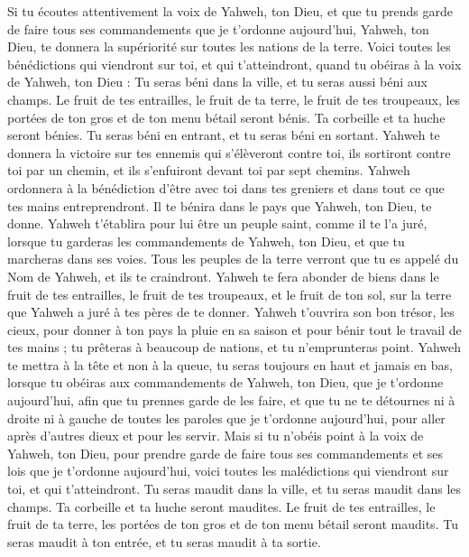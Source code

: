 \begin{multicols}{2}
\VerseOne{}Si tu écoutes attentivement la voix de Yahweh, ton Dieu, et que tu prends garde de faire tous ses commandements que je t’ordonne aujourd'hui, Yahweh, ton Dieu, te donnera la supériorité sur toutes les nations de la terre.
Voici toutes les bénédictions qui viendront sur toi, et qui t'atteindront, quand tu obéiras à la voix de Yahweh, ton Dieu :
Tu seras béni dans la ville, et tu seras aussi béni aux champs.
Le fruit de tes entrailles, le fruit de ta terre, le fruit de tes troupeaux, les portées de ton gros et de ton menu bétail seront bénis.
Ta corbeille et ta huche seront bénies.
Tu seras béni en entrant, et tu seras béni en sortant.
Yahweh te donnera la victoire sur tes ennemis qui s'élèveront contre toi, ils sortiront contre toi par un chemin, et ils s'enfuiront devant toi par sept chemins.
Yahweh ordonnera à la bénédiction d’être avec toi dans tes greniers et dans tout ce que tes mains entreprendront. Il te bénira dans le pays que Yahweh, ton Dieu, te donne.
Yahweh t'établira pour lui être un peuple saint, comme il te l'a juré, lorsque tu garderas les commandements de Yahweh, ton Dieu, et que tu marcheras dans ses voies.
Tous les peuples de la terre verront que tu es appelé du Nom de Yahweh, et ils te craindront.
Yahweh te fera abonder de biens dans le fruit de tes entrailles, le fruit de tes troupeaux, et le fruit de ton sol, sur la terre que Yahweh a juré à tes pères de te donner.
Yahweh t'ouvrira son bon trésor, les cieux, pour donner à ton pays la pluie en sa saison et pour bénir tout le travail de tes mains ; tu prêteras à beaucoup de nations, et tu n'emprunteras point.
Yahweh te mettra à la tête et non à la queue, tu seras toujours en haut et jamais en bas, lorsque tu obéiras aux commandements de Yahweh, ton Dieu, que je t’ordonne aujourd'hui, afin que tu prennes garde de les faire,
et que tu ne te détournes ni à droite ni à gauche de toutes les paroles que je t’ordonne aujourd'hui, pour aller après d'autres dieux et pour les servir.
Mais si tu n'obéis point à la voix de Yahweh, ton Dieu, pour prendre garde de faire tous ses commandements et ses lois que je t’ordonne aujourd'hui, voici toutes les malédictions qui viendront sur toi, et qui t'atteindront.
Tu seras maudit dans la ville, et tu seras maudit dans les champs.
Ta corbeille et ta huche seront maudites.
Le fruit de tes entrailles, le fruit de ta terre, les portées de ton gros et de ton menu bétail seront maudits.
Tu seras maudit à ton entrée, et tu seras maudit à ta sortie.

\end{multicols}
